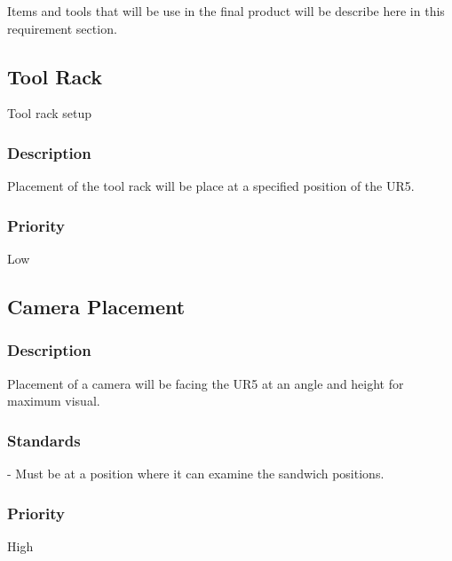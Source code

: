 Items and tools that will be use in the final product will be describe here in this requirement section.

\subsection{Tool Rack}
Tool rack setup
\subsubsection{Description}
Placement of the tool rack will be place at a specified position of the UR5.
\subsubsection{Priority}
Low


\subsection{Camera Placement}
\subsubsection{Description}
Placement of a camera will be facing the UR5 at an angle and height for maximum visual.
\subsubsection{Standards}
- Must be at a position where it can examine the sandwich positions.
\subsubsection{Priority}
High